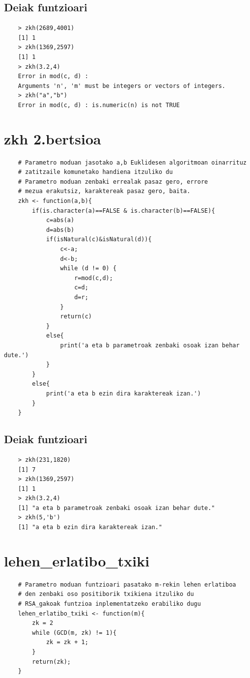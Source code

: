 \documentclass[12pt]{basque-book}
\begin{document}
\newpage
\subsection{Deiak funtzioari}
\begin{verbatim}
    > zkh(2689,4001)
    [1] 1
    > zkh(1369,2597)
    [1] 1
    > zkh(3.2,4)
    Error in mod(c, d) : 
    Arguments 'n', 'm' must be integers or vectors of integers. 
    > zkh("a","b")
    Error in mod(c, d) : is.numeric(n) is not TRUE 
\end{verbatim}

\newpage

\section{zkh 2.bertsioa}
\begin{verbatim}
    # Parametro moduan jasotako a,b Euklidesen algoritmoan oinarrituz
    # zatitzaile komunetako handiena itzuliko du
    # Parametro moduan zenbaki errealak pasaz gero, errore
    # mezua erakutsiz, karaktereak pasaz gero, baita.
    zkh <- function(a,b){ 
        if(is.character(a)==FALSE & is.character(b)==FALSE){
            c=abs(a)
            d=abs(b)
            if(isNatural(c)&isNatural(d)){
                c<-a;
                d<-b;
                while (d != 0) {
                    r=mod(c,d);
                    c=d;
                    d=r;
                }
                return(c)
            }
            else{
                print('a eta b parametroak zenbaki osoak izan behar dute.')
            }
        }
        else{  
            print('a eta b ezin dira karaktereak izan.')
        }
    }
\end{verbatim}

\newpage

\subsection{Deiak funtzioari}
\begin{verbatim}
    > zkh(231,1820)
    [1] 7
    > zkh(1369,2597)
    [1] 1
    > zkh(3.2,4)
    [1] "a eta b parametroak zenbaki osoak izan behar dute." 
    > zkh(5,'b')
    [1] "a eta b ezin dira karaktereak izan."
\end{verbatim}

\newpage
\section{lehen\_erlatibo\_txiki}
\begin{verbatim}
    # Parametro moduan funtzioari pasatako m-rekin lehen erlatiboa 
    # den zenbaki oso positiborik txikiena itzuliko du
    # RSA_gakoak funtzioa inplementatzeko erabiliko dugu
    lehen_erlatibo_txiki <- function(m){
        zk = 2
        while (GCD(m, zk) != 1){
            zk = zk + 1;
        }
        return(zk);
    }
\end{verbatim}
\end{document}
